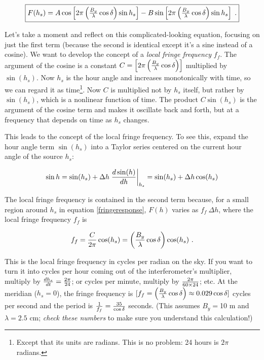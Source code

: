 \documentclass[11pt,preprint]{aastex}
\begin{document}
\begin{equation} \label{maineqn} \fbox{$
\label{fringeresponse}
 F(h_s) = A \cos \left[2 \pi \left( {B_y \over \lambda} \cos\delta \right) \sin h_s\right] 
 - B \sin \left[2 \pi \left( {B_y \over \lambda} \cos\delta \right) \sin h_s\right] \; . 
$}
\end{equation}

	Let's take a moment and reflect on this complicated-looking
equation, focusing on just the first term (because the second is
identical except it's a sine instead of a cosine). We want to develop
the concept of a {\it local fringe frequency} $f_f$. The argument of the
cosine is a constant $C=\left[2 \pi \left( {B_y \over \lambda}
\cos\delta \right)\right]$ multiplied by $\sin( h_s)$. Now $h_s$ is the hour
angle and increases monotonically with time, so we can regard it as
time\footnote{Except that its units are radians. This is no problem: 24
hours is $2\pi$ radians.}. Now $C$ is multiplied not by $h_s$ itself, but
rather by $\sin( h_s)$, which is a nonlinear function of time. The product
$C \sin(h_s)$ is the argument of the cosine term and makes it oscillate
back and forth, but at a frequency that depends on time as $h_s$ changes. 

	This leads to the concept of the local fringe frequency. To see
this, expand the hour angle term $\sin (h_s)$ into a Taylor series
centered on the current hour angle of the source $h_s$:

\begin{equation} \label{taylorexpansion}
\sin h = \sin( h_s) + 
  \Delta h \left. {d \sin(h) \over dh}\right|_{h_s} = 
\sin( h_s) + \Delta h \cos( h_s) 
\end{equation}

\noindent The local fringe frequency is contained in the second term
because, for a small region around $h_s$ in equation
\ref{fringeresponse}, $F(h)$ varies as $f_f \ \Delta h$, where  the
local fringe frequency $f_f$ is

\begin{equation} \label{fringefreq}
f_f = {C \over 2\pi}  \cos(h_s) = \left( {B_y \over \lambda} \cos\delta
\right) \cos( h_s) \ .
\end{equation}

\noindent This is the local fringe frequency in cycles per radian on the
sky. If you want to turn it into cycles per hour coming out of the
interferometer's multiplier, multiply by ${dh_s \over dt} = {2\pi \over
24}$; or cycles per minute, multiply by $2\pi \over 60 \times 24$;
etc. At the meridian ($h_s=0$), the fringe frequency is $[f_f =
\left({B_y \over \lambda} \cos{\delta} \right) \approx 0.029 \cos
\delta]$ cycles per second and the period is ${1 \over f_f} = {35 \over
\cos \delta}$ seconds. (This assumes $B_y=$10 m and $\lambda=2.5$ cm;
{\it check these numbers} to make sure you understand this calculation!)
\end{document}
